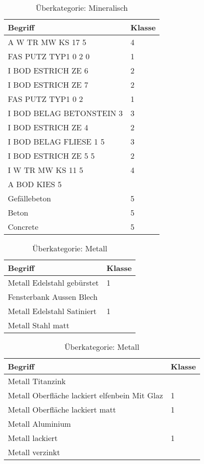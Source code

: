 \begin{table}[h]
	
	\label{t:evaluation-example7}
	\centering
	\begin{tabular}{|p{}|p{}|}
		\hline
		\textbf{Begriff} & \textbf{Klasse} \\ \hline
		 A W TR MW KS 17 5 & 4 \\ \hline
		FAS PUTZ TYP1 0 2 0 & 1 \\ \hline
		I BOD ESTRICH ZE 6 & 2 \\ \hline
		I BOD ESTRICH ZE 7 & 2 \\ \hline
		FAS PUTZ TYP1 0 2 & 1 \\ \hline
		I BOD BELAG BETONSTEIN 3 & 3 \\ \hline
		I BOD ESTRICH ZE 4 & 2 \\ \hline
		I BOD BELAG FLIESE 1 5 & 3 \\ \hline
		I BOD ESTRICH ZE 5 5 & 2 \\ \hline
		I W TR MW KS 11 5 & 4 \\ \hline
		A BOD KIES 5 & ~ \\ \hline
		Gefällebeton & 5 \\ \hline
		Beton & 5 \\ \hline
		Concrete & 5 \\ \hline
	\end{tabular}
	\caption{Überkategorie: Mineralisch}
\end{table}

\begin{table}[h]
	
	\label{t:evaluation-example8}
	\centering
	\begin{tabular}{|p{}|p{}|}
		\hline
		\textbf{Begriff} & \textbf{Klasse} \\ \hline
		Metall Edelstahl gebürstet & 1 \\ \hline
		Fensterbank Aussen Blech & ~ \\ \hline
		Metall Edelstahl Satiniert & 1 \\ \hline
		Metall Stahl matt & ~ \\ \hline
	\end{tabular}
	\caption{Überkategorie: Metall}
\end{table}

\begin{table}[h]
	
	\label{t:evaluation-example9}
	\centering
	\begin{tabular}{|p{}|p{}|}
		\hline
		\textbf{Begriff} & \textbf{Klasse} \\ \hline
		Metall Titanzink & ~ \\ \hline
		Metall Oberfläche lackiert elfenbein Mit Glaz & 1 \\ \hline
		Metall Oberfläche lackiert matt & 1 \\ \hline
		Metall Aluminium & ~ \\ \hline
		Metall lackiert & 1 \\ \hline
		Metall verzinkt & ~ \\ \hline
	\end{tabular}
	\caption{Überkategorie: Metall}
\end{table}


